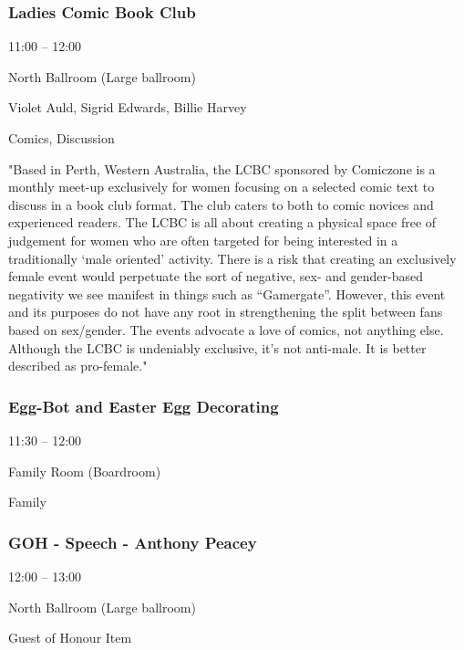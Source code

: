 \documentclass{scrreprt}
\begin{document}
\begin{multicols}{2}
\subsubsection*{Ladies Comic Book Club}\begin{description}
\setlength{\itemsep}{0pt}
\setlength{\parsep}{0pt}
\setlength{\parskip}{0pt}
\item[Time:]{11:00 -- 12:00}
\item[Venue:]{North Ballroom (Large ballroom)}
\item[People:]{Violet Auld, Sigrid Edwards, Billie Harvey}
\item[Tags:]{Comics, Discussion}\end{description}
"Based in Perth, Western Australia, the LCBC sponsored by Comiczone is a monthly meet-up exclusively for women focusing on a selected comic text to discuss in a book club format. The club caters to both to comic novices and experienced readers. The LCBC is all about creating a physical space free of judgement for women who are often targeted for being interested in a traditionally ‘male oriented’ activity. There is a risk that creating an exclusively female event would perpetuate the sort of negative, sex- and gender-based negativity we see manifest in things such as “Gamergate”. However, this event and its purposes do not have any root in strengthening the split between fans based on sex/gender. The events advocate a love of comics, not anything else. Although the LCBC is undeniably exclusive, it’s not anti-male. It is better described as pro-female."
\subsubsection*{Egg-Bot and Easter Egg Decorating}\begin{description}
\setlength{\itemsep}{0pt}
\setlength{\parsep}{0pt}
\setlength{\parskip}{0pt}
\item[Time:]{11:30 -- 12:00}
\item[Venue:]{Family Room (Boardroom)}
\item[Tags:]{Family}\end{description}

\subsubsection*{GOH - Speech - Anthony Peacey}\begin{description}
\setlength{\itemsep}{0pt}
\setlength{\parsep}{0pt}
\setlength{\parskip}{0pt}
\item[Time:]{12:00 -- 13:00}
\item[Venue:]{North Ballroom (Large ballroom)}
\item[Tags:]{Guest of Honour Item}\end{description}


\end{multicols}
\end{document}
